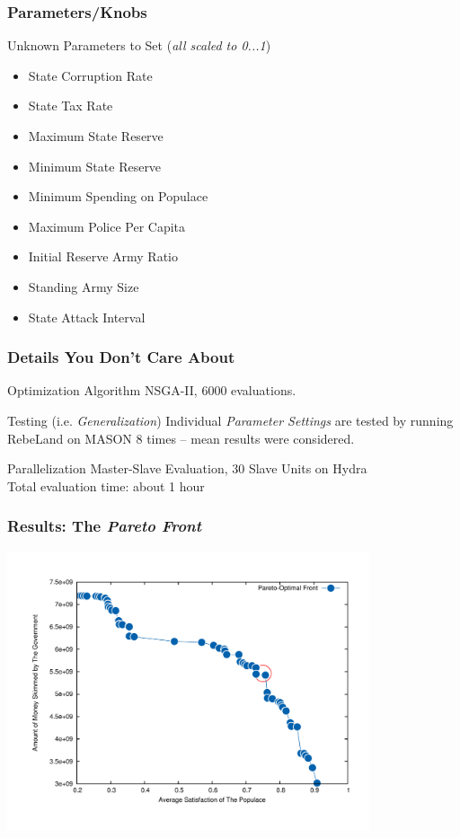 \documentclass{beamer}
\begin{document}
\begin{frame}
	\frametitle{Parameters/Knobs}
	\begin{block}{Unknown Parameters to Set (\emph{all scaled to 0...1})}
		 \begin{itemize}
			\item State Corruption Rate
			\item State Tax Rate
			\item Maximum State Reserve
			\item Minimum State Reserve
			\item Minimum Spending on Populace
			\item Maximum Police Per Capita
			\item Initial Reserve Army Ratio
			\item Standing Army Size
			\item State Attack Interval
		 \end{itemize}
	\end{block}
\end{frame}
\begin{frame}
	\frametitle{Details You Don't Care About}
	\begin{block}{Optimization Algorithm}
		NSGA-II, 6000 evaluations.
	\end{block}
	\begin{block}{Testing (i.e. \textit{Generalization})}
		Individual \textit{Parameter Settings} are tested by running RebeLand on MASON 8 times -- mean results were considered.
	\end{block}
	\begin{block}{Parallelization}
		Master-Slave Evaluation, 30 Slave Units on Hydra\\
		Total evaluation time: about 1 hour
	\end{block}
\end{frame}
\begin{frame}
	\frametitle{Results: The \emph{Pareto Front}}
	\centering
	\includegraphics[width=0.8\textwidth,keepaspectratio,angle=0]{front.pdf}
\end{frame}
\end{document}
